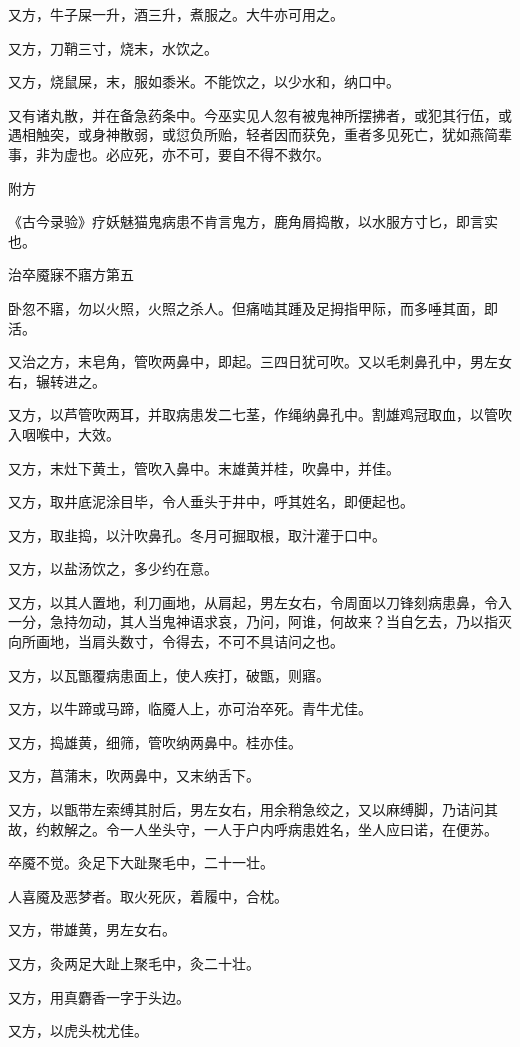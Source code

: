 \documentclass[12pt,UTF8]{ctexbook}
\begin{document}
又方，牛子屎一升，酒三升，煮服之。大牛亦可用之。

又方，刀鞘三寸，烧末，水饮之。

又方，烧鼠屎，末，服如黍米。不能饮之，以少水和，纳口中。

又有诸丸散，并在备急药条中。今巫实见人忽有被鬼神所摆拂者，或犯其行伍，或遇相触突，或身神散弱，或愆负所贻，轻者因而获免，重者多见死亡，犹如燕简辈事，非为虚也。必应死，亦不可，要自不得不救尔。

附方

《古今录验》疗妖魅猫鬼病患不肯言鬼方，鹿角屑捣散，以水服方寸匕，即言实也。

治卒魇寐不寤方第五

卧忽不寤，勿以火照，火照之杀人。但痛啮其踵及足拇指甲际，而多唾其面，即活。

又治之方，末皂角，管吹两鼻中，即起。三四日犹可吹。又以毛刺鼻孔中，男左女右，辗转进之。

又方，以芦管吹两耳，并取病患发二七茎，作绳纳鼻孔中。割雄鸡冠取血，以管吹入咽喉中，大效。

又方，末灶下黄土，管吹入鼻中。末雄黄并桂，吹鼻中，并佳。

又方，取井底泥涂目毕，令人垂头于井中，呼其姓名，即便起也。

又方，取韭捣，以汁吹鼻孔。冬月可掘取根，取汁灌于口中。

又方，以盐汤饮之，多少约在意。

又方，以其人置地，利刀画地，从肩起，男左女右，令周面以刀锋刻病患鼻，令入一分，急持勿动，其人当鬼神语求哀，乃问，阿谁，何故来？当自乞去，乃以指灭向所画地，当肩头数寸，令得去，不可不具诘问之也。

又方，以瓦甑覆病患面上，使人疾打，破甑，则寤。

又方，以牛蹄或马蹄，临魇人上，亦可治卒死。青牛尤佳。

又方，捣雄黄，细筛，管吹纳两鼻中。桂亦佳。

又方，菖蒲末，吹两鼻中，又末纳舌下。

又方，以甑带左索缚其肘后，男左女右，用余稍急绞之，又以麻缚脚，乃诘问其故，约敕解之。令一人坐头守，一人于户内呼病患姓名，坐人应曰诺，在便苏。

卒魇不觉。灸足下大趾聚毛中，二十一壮。

人喜魇及恶梦者。取火死灰，着履中，合枕。

又方，带雄黄，男左女右。

又方，灸两足大趾上聚毛中，灸二十壮。

又方，用真麝香一字于头边。

又方，以虎头枕尤佳。
\end{document}
